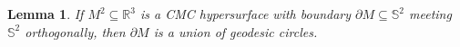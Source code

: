 \documentclass[10pt]{amsart}
\newcommand{\IP}[2]{\left< #1 , #2 \right>}
\newcommand{\R}{\ensuremath{\mathbb{R}}}
\renewcommand{\S}{\ensuremath{\mathbb{S}}}
\newtheorem{thm}{Theorem}[section]
\newtheorem{lem}[thm]{Lemma}
\theoremstyle{remark}
\begin{document}
%
%
%

\begin{lem}
If \(M^2 \subseteq \R^3\) is a CMC hypersurface with boundary \(\partial M \subseteq \S^2\) meeting \(\S^2\) orthogonally, then \(\partial M\) is a union of geodesic circles.
\end{lem}
\end{document}
